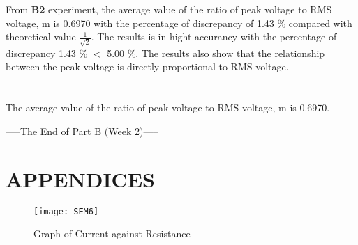 \documentclass[twocolumn,a4paper,11pt]{article}
\begin{document}
From \textbf{B2} experiment, the average value of the ratio of peak voltage to RMS voltage, m is 0.6970 with the percentage of discrepancy of 1.43 \% compared with theoretical value $\frac{1}{\sqrt{2}}$. The results is in hight accurancy with the percentage of discrepancy 1.43 \% $<$ 5.00 \%. The results also show that the relationship between the peak voltage is directly proportional to RMS voltage.
\\
\\
 \\

The average value of the ratio of peak voltage to RMS voltage, m is 0.6970. 
\vfill

\begin{center}
-----The End of Part B (Week 2)-----
\end{center}
\newpage
\onecolumn
\section*{\center APPENDICES}
\label{sec:APPENDICES}
\begin{figure}[htbp]
  \centering
  \texttt{[image: SEM6]}
  \caption{Graph of Current against Resistance}
  \label{1}
  \end{figure}
\newpage
\end{document}
